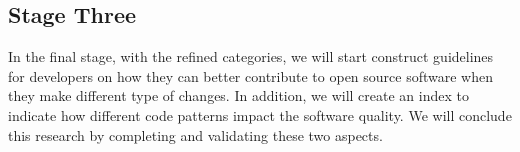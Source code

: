 \subsection{Stage Three}
In the final stage, with the refined categories, we will start construct guidelines for developers on how they can better contribute to open source software when they make different type of changes.
In addition, we will create an index to indicate how different code patterns impact the software quality.
We will conclude this research by completing and validating these two aspects. 

